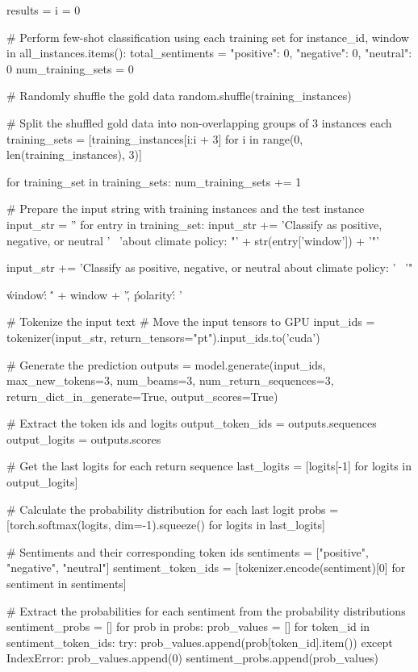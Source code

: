 \begin{pyin}
results = {}
i = 0

# Perform few-shot classification using each training set
for instance_id, window in all_instances.items():
    total_sentiments = {"positive": 0, "negative": 0, "neutral": 0}
    num_training_sets = 0

    # Randomly shuffle the gold data
    random.shuffle(training_instances)

    # Split the shuffled gold data into non-overlapping groups of 3 instances each
    training_sets = [training_instances[i:i + 3] for i in range(0, len(training_instances), 3)]

    for training_set in training_sets:
        num_training_sets += 1

        # Prepare the input string with training instances and the test instance
        input_str = ''
        for entry in training_set:
            input_str += 'Classify as positive, negative, or neutral ' \
                         'about climate policy: "' + str(entry['window']) + '"\n\n'

        input_str += 'Classify as positive, negative, or neutral about climate policy: ' \
                     '"{\'window\': \'' + window + '\', \'polarity\': '

        # Tokenize the input text
        # Move the input tensors to GPU
        input_ids = tokenizer(input_str, return_tensors="pt").input_ids.to('cuda')

        # Generate the prediction
        outputs = model.generate(input_ids, max_new_tokens=3, num_beams=3, num_return_sequences=3,
                                 return_dict_in_generate=True, output_scores=True)

        # Extract the token ids and logits
        output_token_ids = outputs.sequences
        output_logits = outputs.scores

        # Get the last logits for each return sequence
        last_logits = [logits[-1] for logits in output_logits]

        # Calculate the probability distribution for each last logit
        probs = [torch.softmax(logits, dim=-1).squeeze() for logits in last_logits]

        # Sentiments and their corresponding token ids
        sentiments = ["positive", "negative", "neutral"]
        sentiment_token_ids = [tokenizer.encode(sentiment)[0] for sentiment in sentiments]

        # Extract the probabilities for each sentiment from the probability distributions
        sentiment_probs = []
        for prob in probs:
            prob_values = []
            for token_id in sentiment_token_ids:
                try:
                    prob_values.append(prob[token_id].item())
                except IndexError:
                    prob_values.append(0)
            sentiment_probs.append(prob_values)

}
\end{pyin}

